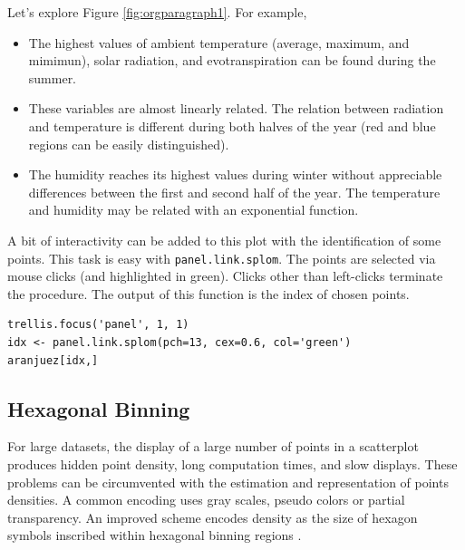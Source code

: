 Let's explore Figure \ref{fig:orgparagraph1}. For example,
\begin{itemize}
\item The highest values of ambient temperature (average, maximum, and
mimimun), solar radiation, and evotranspiration can be found
during the summer.
\item These variables are almost linearly related. The relation
between radiation and temperature is different during both
halves of the year (red and blue regions can be easily distinguished).
\item The humidity reaches its highest values during winter without
appreciable differences between the first and second half of the
year. The temperature and humidity may be related with an
exponential function.
\end{itemize}

A bit of interactivity can be added to this plot with the
identification of some points. This task is easy with
\texttt{panel.link.splom}. The points are selected via mouse clicks (and
highlighted in green). Clicks other than left-clicks terminate the
procedure. The output of this function is the index of chosen
points.


\lstset{language=R,label= ,caption= ,captionpos=b,numbers=none}
\begin{lstlisting}
trellis.focus('panel', 1, 1)
idx <- panel.link.splom(pch=13, cex=0.6, col='green')
aranjuez[idx,]
\end{lstlisting}


\subsection{Hexagonal Binning}
\label{sec:orgheadline1}
\label{orgtarget2}

For large datasets, the display of a large number of points in a
scatterplot produces hidden point density, long computation times,
and slow displays. These problems can be circumvented with the
estimation and representation of points densities.  A common
encoding uses gray scales, pseudo colors or partial
transparency. An improved scheme encodes density as the size of
hexagon symbols inscribed within hexagonal binning regions
\cite{Carr.Littlefield.ea1987}.

